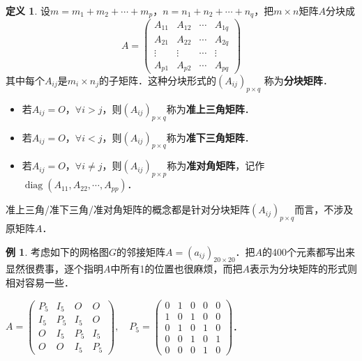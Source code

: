 \documentclass[a4paper,fontset=windows]{ctexbook}
\theoremstyle{definition}
\newtheorem{definition}{定义}[chapter]
\newtheorem{example}{例}[chapter]
\DeclareMathOperator{\diag}{diag}
\def\note{\noindent\raisebox{10pt}{\dbend}\hspace{7pt}}
\begin{document}
\begin{definition}
设$m=m_1+m_2+\cdots+m_p$，$n=n_1+n_2+\cdots+n_q$，把$m\times n$矩阵$A$分块成
$$A=\begin{pmatrix}
A_{11}&A_{12}&\cdots&A_{1q} \\ A_{21}&A_{22}&\cdots&A_{2q} \\ \vdots&\vdots&\cdots&\vdots \\ A_{p1}&A_{p2}&\cdots&A_{pq}\end{pmatrix}$$
其中每个$A_{ij}$是$m_i\times n_j$的子矩阵．这种分块形式的$(A_{ij})_{p\times q}$ 称为{\bf 分块矩阵}．
\begin{itemize}
\item 若$A_{ij}=O$，$\forall i>j$，则$(A_{ij})_{p\times q}$称为{\bf 准上三角矩阵}．
\item 若$A_{ij}=O$，$\forall i<j$，则$(A_{ij})_{p\times q}$称为{\bf 准下三角矩阵}．
\item 若$A_{ij}=O$，$\forall i\ne j$，则$(A_{ij})_{p\times p}$称为{\bf 准对角矩阵}，记作$\diag(A_{11},A_{22},\cdots,A_{pp})$．
\end{itemize}
\end{definition}

\note 准上三角/准下三角/准对角矩阵的概念都是针对分块矩阵$(A_{ij})_{p\times q}$而言，不涉及原矩阵$A$．

\begin{example}\label{ex2.10}
考虑如下的网格图$G$的邻接矩阵$A=(a_{ij})_{20\times 20}$．把$A$的400个元素都写出来显然很费事，逐个指明$A$中所有1的位置也很麻烦，而把$A$表示为分块矩阵的形式则相对容易一些．
\begin{center}
\hspace{0.5in}
$A=\begin{pmatrix}P_5&I_5&O&O \\ I_5&P_5&I_5&O \\ O&I_5&P_5&I_5 \\ O&O&I_5&P_5\end{pmatrix},\quad P_5=\begin{pmatrix}0&1&0&0&0 \\ 1&0&1&0&0 \\ 0&1&0&1&0 \\ 0&0&1&0&1 \\ 0&0&0&1&0\end{pmatrix}$．
\end{center}
\end{example}
\end{document}
